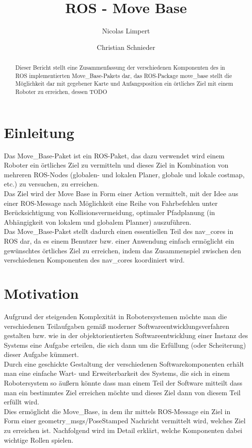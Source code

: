 \documentclass[oribibl]{llncs}
\begin{document}
 \title{ROS - Move Base}

\author{Nicolas Limpert \and Christian Schnieder} 

\maketitle


\begin{abstract} Dieser Bericht stellt eine Zusammenfassung der verschiedenen Komponenten des in ROS implementierten Move\_Base-Pakets dar, das ROS-Package move\_base stellt  die Möglichkeit dar mit gegebener Karte und Anfangsposition ein örtliches Ziel mit einem Roboter zu erreichen, dessen TODO \end{abstract}
\newpage


\section{Einleitung}
Das Move\_Base-Paket ist ein ROS-Paket, das dazu verwendet wird einem Roboter ein örtliches Ziel zu vermitteln und dieses Ziel in Kombination von mehreren ROS-Nodes (globalen- und lokalen Planer, globale und lokale costmap, etc.) zu versuchen, zu erreichen.\\
Das Ziel wird der Move Base in Form einer Action vermittelt, mit der Idee aus einer ROS-Message nach Möglichkeit eine Reihe von Fahrbefehlen unter Berücksichtigung von Kollisionsvermeidung, optimaler Pfadplanung (in Abhängigkeit von lokalem und globalem Planner) auszuführen.\\
Das Move\_Base-Paket stellt dadurch einen essentiellen Teil des nav\_cores in ROS dar, da es einem Benutzer bzw. einer Anwendung einfach ermöglicht ein gewünschtes örtliches Ziel zu erreichen, indem das Zusammenspiel zwischen den verschiedenen Komponenten des nav\_cores koordiniert wird.

\section{Motivation}
Aufgrund der steigenden Komplexität in Robotersystemen möchte man die verschiedenen Teilaufgaben gemäß moderner Softwareentwicklungsverfahren gestalten bzw. wie in der objektorientierten Softwareentwicklung einer Instanz des Systems eine Aufgabe erteilen, die sich dann um die Erfüllung (oder Scheiterung) dieser Aufgabe kümmert.\\
Durch eine geschickte Gestaltung der verschiedenen Softwarekomponenten erhält man eine einfache Wart- und Erweiterbarkeit des Systems, die sich in einem Robotersystem so äußern könnte dass man einem Teil der Software mitteilt dass man ein bestimmtes Ziel erreichen möchte und dieses Ziel dann von diesem Teil erfüllt wird.\\
Dies ermöglicht die Move\_Base, in dem ihr mittels ROS-Message ein Ziel in Form einer geometry\_msgs/PoseStamped Nachricht vermittelt wird, welches Ziel zu erreichen ist. Nachfolgend wird im Detail erklärt, welche Komponenten dabei wichtige Rollen spielen.
\newpage
\end{document}
